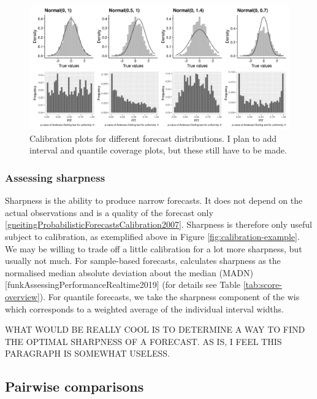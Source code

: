 \documentclass[article,shortnames]{jss}
\begin{document}
\begin{figure}[h]
\centering
\includegraphics{plots/calibration-diagnostic-examples.png}
\caption{\label{fig:calibration-plots} Calibration plots for different forecast distributions. I plan to add interval and quantile coverage plots, but these still have to be made.}
\end{figure}




\subsubsection{Assessing sharpness}

Sharpness is the ability to produce narrow forecasts. It does not depend on the actual observations and is a quality of the forecast only \ref{gneitingProbabilisticForecastsCalibration2007}. Sharpness is therefore only useful subject to calibration, as exemplified above in Figure \ref{fig:calibration-example}. We may be willing to trade off a little calibration for a lot more sharpness, but usually not much. For sample-based forecasts,  calculates sharpness as the normalised median absolute deviation about the median (MADN) [funkAssessingPerformanceRealtime2019] (for details see Table \ref{tab:score-overview}). For quantile forecasts, we take the sharpness component of the wis which corresponds to a weighted average of the individual interval widths. 

WHAT WOULD BE REALLY COOL IS TO DETERMINE A WAY TO FIND THE OPTIMAL SHARPNESS OF A FORECAST. AS IS, I FEEL THIS PARAGRAPH IS SOMEWHAT USELESS. 

\subsection{Pairwise comparisons} 
\end{document}
